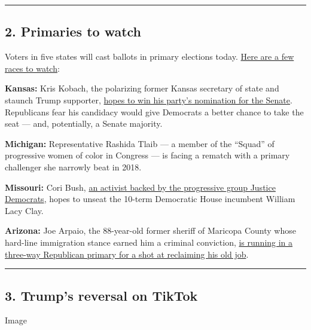\begin{center}\rule{0.5\linewidth}{\linethickness}\end{center}

\hypertarget{2-primaries-to-watch}{%
\subsection{2. Primaries to watch}\label{2-primaries-to-watch}}

Voters in five states will cast ballots in primary elections today.
\href{https://www.nytimes.com/2020/08/04/us/elections/primary-election-michigan-arizona-kansas.html}{Here
are a few races to watch}:

\textbf{Kansas:} Kris Kobach, the polarizing former Kansas secretary of
state and staunch Trump supporter,
\href{https://www.nytimes.com/2020/08/03/us/politics/kris-kobach-kansas-senate-primary.html}{hopes
to win his party's nomination for the Senate}. Republicans fear his
candidacy would give Democrats a better chance to take the seat --- and,
potentially, a Senate majority.

\textbf{Michigan:} Representative Rashida Tlaib --- a member of the
``Squad'' of progressive women of color in Congress --- is facing a
rematch with a primary challenger she narrowly beat in 2018.

\textbf{Missouri:} Cori Bush,
\href{https://www.nytimes.com/2020/08/02/us/politics/cori-bush-william-lacy-clay-missouri.html}{an
activist backed by the progressive group Justice Democrats}, hopes to
unseat the 10-term Democratic House incumbent William Lacy Clay.

\textbf{Arizona:} Joe Arpaio, the 88-year-old former sheriff of Maricopa
County whose hard-line immigration stance earned him a criminal
conviction,
\href{https://www.nytimes.com/2020/08/02/us/politics/arizona-election-joe-arpaio.html}{is
running in a three-way Republican primary for a shot at reclaiming his
old job}.

\begin{center}\rule{0.5\linewidth}{\linethickness}\end{center}

\hypertarget{3-trumps-reversal-on-tiktok}{%
\subsection{3. Trump's reversal on
TikTok}\label{3-trumps-reversal-on-tiktok}}

Image

